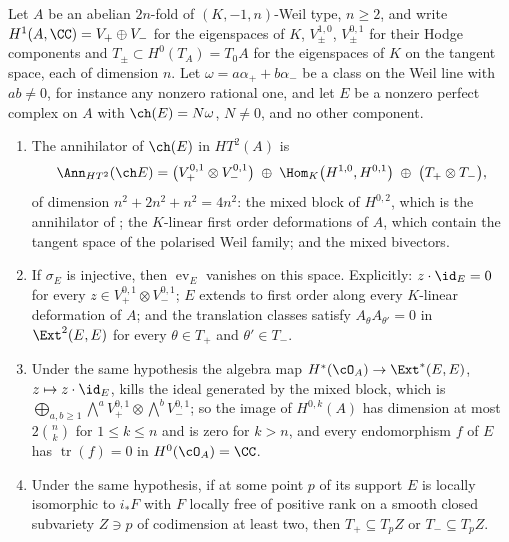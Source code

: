 \begin{theorem}
\label{thm:p2forces}
Let $A$ be an abelian $2n$-fold of $(K,-1,n)$-Weil type, $n\ge2$, and write
$H^{1}(A,\CC)=V_{+}\oplus V_{-}$ for the eigenspaces of $K$,
$V_{\pm}^{1,0}$, $V_{\pm}^{0,1}$ for their Hodge components and
$T_{\pm}\subset H^{0}(T_{A})=T_{0}A$ for the eigenspaces of $K$ on the tangent
space, each of dimension $n$. Let $\omega=a\alpha_{+}+b\alpha_{-}$ be a
class on the Weil line with $ab\ne0$, for instance any nonzero rational one,
and let $E$ be a nonzero perfect complex on $A$ with $\ch(E)=N\omega$,
$N\ne0$, and no other component.
\begin{enumerate}[label=\textup{(\roman*)},leftmargin=2.6em,itemsep=2pt]
\item The annihilator of $\ch(E)$ in $HT^{2}(A)$ is
  \[
    \Ann_{HT^{2}}(\ch E)
    =\bigl(V_{+}^{0,1}\otimes V_{-}^{0,1}\bigr)
    \;\oplus\;\Hom_{K}\bigl(H^{1,0},H^{0,1}\bigr)
    \;\oplus\;\bigl(T_{+}\otimes T_{-}\bigr),
  \]
  of dimension $n^{2}+2n^{2}+n^{2}=4n^{2}$: the mixed block of $H^{0,2}$,
  which is the annihilator of ; the $K$-linear first
  order deformations of $A$, which contain the tangent space of the polarised
  Weil family; and the mixed bivectors.
\item If $\sigma_{E}$ is injective, then $\operatorname{ev}_{E}$ vanishes on
  this space. Explicitly: $z\cdot\id_{E}=0$ for every $z\in V_{+}^{0,1}\otimes
  V_{-}^{0,1}$; $E$ extends to first order along every $K$-linear deformation
  of $A$; and the translation classes satisfy $A_{\theta}A_{\theta'}=0$ in
  $\Ext^{2}(E,E)$ for every $\theta\in T_{+}$ and $\theta'\in T_{-}$.
\item Under the same hypothesis the algebra map $H^{*}(\cO_{A})\to\Ext^{*}(E,E)$,
  $z\mapsto z\cdot\id_{E}$, kills the ideal generated by the mixed block,
  which is $\bigoplus_{a,b\ge1}\bigwedge^{a}V_{+}^{0,1}\otimes\bigwedge^{b}V_{-}^{0,1}$;
  so the image of $H^{0,k}(A)$ has dimension at most $2\binom{n}{k}$ for
  $1\le k\le n$ and is zero for $k>n$, and every endomorphism $f$ of $E$ has
  $\operatorname{tr}(f)=0$ in $H^{0}(\cO_{A})=\CC$.
\item Under the same hypothesis, if at some point $p$ of its support $E$ is
  locally isomorphic to $i_{*}F$ with $F$ locally free of positive rank on a
  smooth closed subvariety $Z\ni p$ of codimension at least two, then
  $T_{+}\subseteq T_{p}Z$ or $T_{-}\subseteq T_{p}Z$.
\end{enumerate}
\end{theorem}

